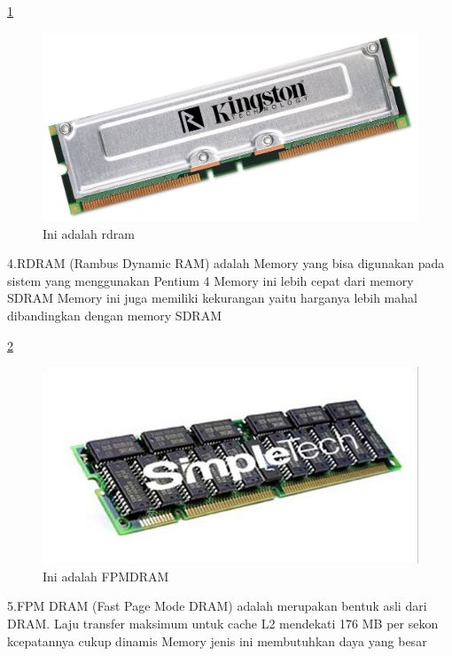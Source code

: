 \ref{rdram}
  \begin{figure}[ht]
  \centerline{\includegraphics[width=1\textwidth]{figures/rdram.jpg}}
  \caption{Ini adalah rdram}
  \label{rdram}
  \end{figure}
4.RDRAM (Rambus Dynamic RAM) adalah Memory yang bisa digunakan pada sistem yang menggunakan Pentium 4
    \-Memory ini lebih cepat dari memory SDRAM
    \-Memory ini juga memiliki kekurangan yaitu harganya lebih mahal dibandingkan dengan memory SDRAM

\ref{FPMDRAM}
  \begin{figure}[ht]
  \centerline{\includegraphics[width=1\textwidth]{figures/FPMDRAM.jpg}}
  \caption{Ini adalah FPMDRAM}
  \label{FPMDRAM}
  \end{figure}
5.FPM DRAM (Fast Page Mode DRAM) adalah merupakan bentuk asli dari DRAM. Laju transfer maksimum untuk cache L2 mendekati 176 MB per sekon
    \-kcepatannya cukup dinamis
    \-Memory jenis ini membutuhkan daya yang besar

